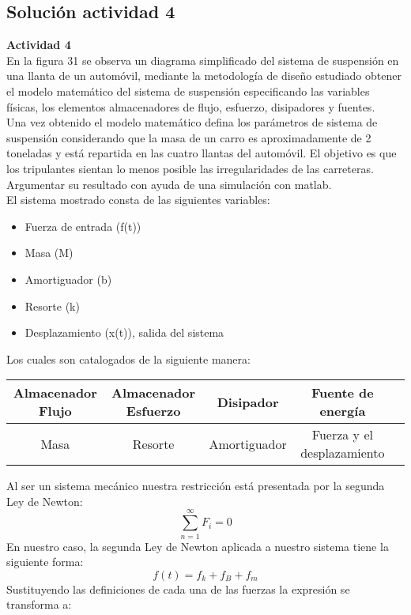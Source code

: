 \subsection{Solución actividad 4}
\noindent \textbf{Actividad 4}\\
 En la figura 31 se observa un diagrama simplificado del sistema de suspensión en una llanta de un automóvil, mediante la metodología de diseño estudiado obtener el modelo matemático del sistema de suspensión especificando las variables físicas, los elementos almacenadores de flujo, esfuerzo, disipadores y fuentes.\\
Una vez obtenido el modelo matemático defina los parámetros de sistema de suspensión considerando que la masa de un carro es aproximadamente de 2 toneladas y está repartida en las cuatro llantas del automóvil. El objetivo es que los tripulantes sientan lo menos posible las irregularidades de las carreteras. Argumentar su resultado con ayuda de una simulación con matlab.\\
El sistema mostrado consta de las siguientes variables:\\
\begin{itemize}
\item Fuerza de entrada (f(t))
\item Masa (M)
\item Amortiguador (b)
\item Resorte (k)
\item Desplazamiento (x(t)), salida del sistema
\end{itemize}
Los cuales son catalogados de la siguiente manera:
\begin{center}
\begin{tabular}{ c c c c c }
\hline
Almacenador Flujo & Almacenador Esfuerzo & Disipador & Fuente de energía\\
\hline
Masa & Resorte & Amortiguador & Fuerza y el desplazamiento\\
\hline
\end{tabular}
\end{center}
Al ser un sistema mecánico nuestra restricción está presentada por la segunda Ley de Newton:
\begin{equation}
\sum_{n=1}^{\infty}F_i=0
\end{equation}
En nuestro caso, la segunda Ley de Newton aplicada a nuestro sistema tiene la siguiente forma:
\begin{equation}
f(t)=f_k+f_B+f_m
\end{equation}
Sustituyendo las definiciones de cada una de las fuerzas la expresión se transforma a:
